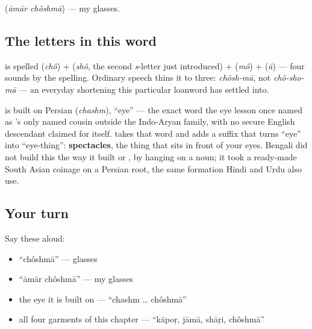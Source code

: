   (\emph{āmār chôshmā}) — my glasses.

\subsection*{The letters in this word}
\textbf{} is spelled \textbf{} (\emph{chô}) + \textbf{} (\emph{shô}, the second \emph{s}-letter  just introduced) + \textbf{} (\emph{mô}) + \textbf{} (\emph{ā}) — four sounds by the spelling. Ordinary speech thins it to three: \emph{chôsh-mā}, not \emph{chô-sho-mā} — an everyday shortening this particular loanword has settled into.

\begin{cousinweb}
\textbf{} is built on Persian \textbf{} (\emph{chashm}), \textquotedblleft{}eye\textquotedblright{} — the exact word the eye lesson once named as 's only named cousin outside the Indo-Aryan family, with no secure English descendant claimed for  itself.  takes that word and adds a suffix that turns \textquotedblleft{}eye\textquotedblright{} into \textquotedblleft{}eye-thing\textquotedblright{}: \textbf{spectacles}, the thing that sits in front of your eyes. Bengali did not build this the way it built   or  , by hanging  on a noun; it took a ready-made South Asian coinage on a Persian root, the same formation Hindi and Urdu also use.
\end{cousinweb}

\subsection*{Your turn}
Say these aloud:

\begin{itemize}
\raggedright
  \item \textquotedblleft{}chôshmā\textquotedblright{} — glasses
  \item \textquotedblleft{}āmār chôshmā\textquotedblright{} — my glasses
  \item the eye it is built on — \textquotedblleft{}chashm … chôshmā\textquotedblright{}
  \item all four garments of this chapter — \textquotedblleft{}kāpoṛ, jāmā, shāṛi, chôshmā\textquotedblright{}
\end{itemize}

